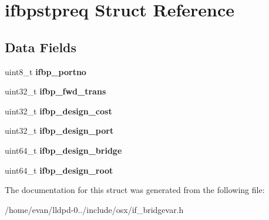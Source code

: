 \section{ifbpstpreq \-Struct \-Reference}
\label{structifbpstpreq}
\subsection*{\-Data \-Fields}
\begin{DoxyCompactItemize}
\item 
uint8\-\_\-t {\bfseries ifbp\-\_\-portno}\label{structifbpstpreq_ae19e9ca224d39f28e2e00d51fec2042b}

\item 
uint32\-\_\-t {\bfseries ifbp\-\_\-fwd\-\_\-trans}\label{structifbpstpreq_a18bc4e69f099438188eb770ed0d3325d}

\item 
uint32\-\_\-t {\bfseries ifbp\-\_\-design\-\_\-cost}\label{structifbpstpreq_a4e83b449c6ffc145df8e9f08ef08f155}

\item 
uint32\-\_\-t {\bfseries ifbp\-\_\-design\-\_\-port}\label{structifbpstpreq_a3299a881e72ae2a3d728df86060754cf}

\item 
uint64\-\_\-t {\bfseries ifbp\-\_\-design\-\_\-bridge}\label{structifbpstpreq_a0a33ee0004a4f236c1ebe6e2c5aafeda}

\item 
uint64\-\_\-t {\bfseries ifbp\-\_\-design\-\_\-root}\label{structifbpstpreq_a3188d94423fb3bdd5aad211029338a6e}

\end{DoxyCompactItemize}


\-The documentation for this struct was generated from the following file\-:\begin{DoxyCompactItemize}
\item 
/home/evan/lldpd-\/0../include/osx/if\-\_\-bridgevar.\-h\end{DoxyCompactItemize}
